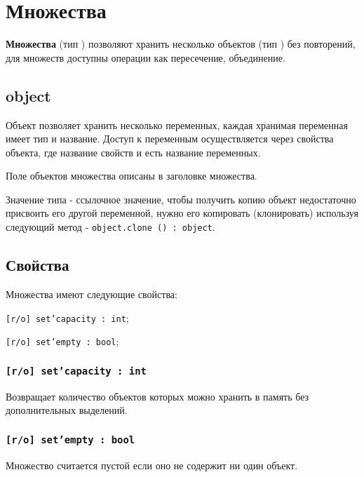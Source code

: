 \section{Множества}

{\bf Множества} (тип \set) позволяют хранить несколько объектов (тип \object) без повторений, для множеств доступны операции как пересечение, объединение.

\subsection{{\color{lightblue} object}}

Объект позволяет хранить несколько переменных, каждая хранимая переменная имеет тип и название. Доступ к переменным осуществляется через свойства объекта, где название свойств и есть название переменных. 

Поле объектов множества описаны в заголовке множества.

Значение типа \object{} - ссылочное значение, чтобы получить копию объект недостаточно присвоить его другой переменной, нужно его копировать (клонировать) используя следующий метод - \texttt{object.clone () : object}.

\subsection{Свойства}

Множества имеют следующие свойства:
\begin{icItems}
\item \texttt{[r/o] set'capacity : int};
\item \texttt{[r/o] set'empty : bool};
\end{icItems}

\subsubsection{\texttt{[r/o] set'capacity : int}}

Возвращает количество объектов которых можно хранить в память без дополнительных выделений.

\subsubsection{\texttt{[r/o] set'empty : bool}}

Множество считается пустой если оно не содержит ни один объект.

